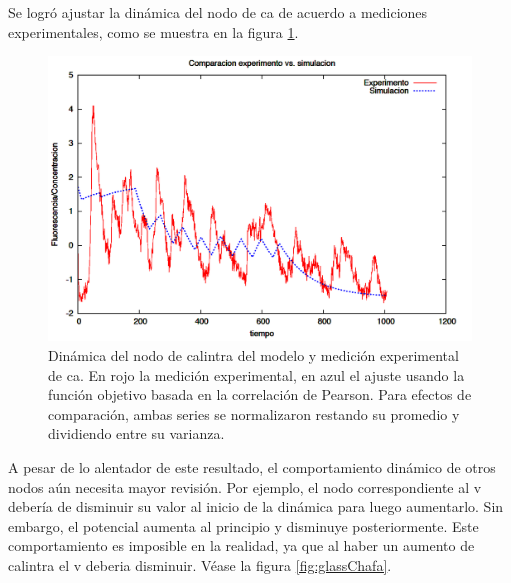 Se logró ajustar la dinámica del nodo de \ac{ca} de acuerdo a mediciones experimentales, como se muestra en la figura \ref{fig:glassChido}. 

\begin{figure}[h]
\includegraphics[width=0.9\linewidth]{gfx/glassChido}
\caption[Dinámica del nodo de \ac{calintra} del modelo y medición experimental de \ac{ca}]{Dinámica del nodo de \ac{calintra} del modelo y medición experimental de \ac{ca}. En rojo la medición experimental, en azul el ajuste usando la función objetivo basada en la correlación de Pearson. Para efectos de comparación, ambas series se normalizaron restando su promedio y dividiendo entre su varianza.}\label{fig:glassChido}
\end{figure}

A pesar de lo alentador de este resultado, el comportamiento dinámico de otros nodos aún necesita mayor revisión. Por ejemplo, el nodo correspondiente al \acf{v} debería de disminuir su valor al inicio de la dinámica para luego aumentarlo. Sin embargo, el potencial aumenta al principio y disminuye posteriormente. Este comportamiento es imposible en la realidad, ya que al haber un aumento de \ac{calintra} el \acf{v} deberia disminuir. Véase la figura \ref{fig:glassChafa}.


